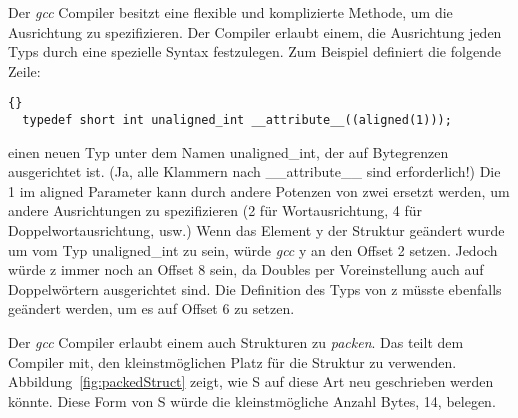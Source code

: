 

Der \emph{gcc}  Compiler
besitzt eine flexible und komplizierte Methode, um die Ausrichtung
zu spezifizieren. Der Compiler erlaubt einem, die Ausrichtung jeden
Typs durch eine spezielle Syntax festzulegen. Zum Beispiel definiert
die folgende Zeile:
\begin{lstlisting}[stepnumber=0]{}
  typedef short int unaligned_int __attribute__((aligned(1)));
\end{lstlisting}
\noindent einen neuen Typ unter dem Namen {\code unaligned\_int},
der auf Bytegrenzen ausgerichtet ist. (Ja, alle Klammern nach {\code
\_\_attribute\_\_} sind erforderlich!) Die 1 im {\code aligned}
Parameter kann durch andere Potenzen von zwei ersetzt werden, um
andere Ausrichtungen zu spezifizieren (2 f\"{u}r Wortausrichtung, 4 f\"{u}r
Doppelwortausrichtung, usw.) Wenn das Element {\code y} der Struktur
ge\"{a}ndert wurde um vom Typ {\code unaligned\_int} zu sein, w\"{u}rde
\emph{gcc} {\code y} an den Offset 2 setzen. Jedoch w\"{u}rde {\code z}
immer noch an Offset 8 sein, da Doubles per Voreinstellung auch auf
Doppelw\"{o}rtern ausgerichtet sind. Die Definition des Typs von {\code
z} m\"{u}sste ebenfalls ge\"{a}ndert werden, um es auf Offset 6 zu setzen.

Der \emph{gcc} Compiler  erlaubt einem auch
Strukturen zu \emph{packen}. Das teilt dem Compiler mit, den
kleinstm\"{o}glichen Platz f\"{u}r die Struktur zu verwenden.
Abbildung~\ref{fig:packedStruct} zeigt, wie {\code S} auf diese Art
neu geschrieben werden k\"{o}nnte. Diese Form von {\code S} w\"{u}rde die
kleinstm\"{o}gliche Anzahl Bytes, 14, belegen.

